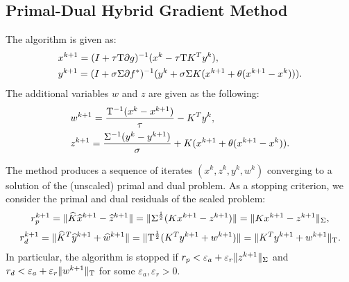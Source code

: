 \documentclass[english,11pt,a4paper]{article}
\begin{document}
\subsection{Primal-Dual Hybrid Gradient Method}
The algorithm is given as:
\begin{equation}
  \begin{aligned}
    &x^{k+1} = (I + \tau \mathrm{T} \partial g)^{-1}(x^k - \tau \mathrm{T} K^T y^k),\\
    &y^{k+1} = (I + \sigma \Sigma \partial f^*)^{-1}(y^k + \sigma \Sigma K (x^{k+1} + \theta (x^{k+1} - x^k))).\\
  \end{aligned}
  \label{eq:pdhgm}
\end{equation}
The additional variables $w$ and $z$ are given as the following:
\begin{equation}
  \begin{aligned}
    &w^{k+1} = \frac{\mathrm{T}^{-1}(x^k - x^{k+1})}{\tau} - K^T y^k,\\
    &z^{k+1} = \frac{\Sigma^{-1}(y^k - y^{k+1})}{\sigma} + K (x^{k+1} + \theta (x^{k+1} - x^k)).
  \end{aligned}
  \label{eq:pdhgm_zw}
\end{equation}

The method produces a sequence of iterates
$(x^k, z^k, y^k, w^k)$ converging to a solution of the (unscaled) primal and dual problem. As a stopping criterion, we consider the 
primal and dual residuals of the scaled problem:
\begin{equation}
  r_p^{k+1} = \Vert \widehat K \widehat x^{k+1} - \widehat z^{k+1} \Vert = \Vert \Sigma^{\frac{1}{2}} (K x^{k+1} - z^{k+1}) \Vert = \Vert Kx^{k+1} - z^{k+1} \Vert_{\Sigma},
\end{equation}
\begin{equation}
  r_d^{k+1} = \Vert \widehat K^T \widehat y^{k+1} + \widehat w^{k+1} \Vert = \Vert \mathrm{T}^{\frac{1}{2}} (K^T y^{k+1} + w^{k+1}) \Vert = \Vert K^T y^{k+1} + w^{k+1} \Vert_{\mathrm{T}}.
\end{equation}
In particular, the algorithm is stopped if $r_p < \varepsilon_a + \varepsilon_r \Vert z^{k+1} \Vert_{\Sigma}$ and $r_d < \varepsilon_a + \varepsilon_r \Vert w^{k+1} \Vert_{\mathrm{T}}$ for some $\varepsilon_a, \varepsilon_r > 0$.
\end{document}
